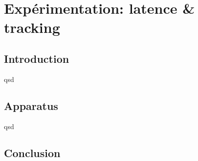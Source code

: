 \part{Expérimentation: latence \& tracking}

\chapter*{Introduction}
\par qsd

\chapter{Apparatus}
\par qsd

\chapter*{Conclusion}
